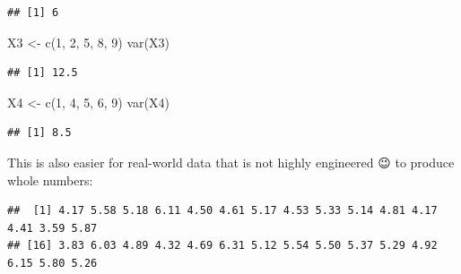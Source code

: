 \documentclass[
]{book}
\newenvironment{Shaded}{\begin{snugshade}}{\end{snugshade}}
\newcommand{\DecValTok}[1]{\textcolor[rgb]{0.00,0.00,0.81}{#1}}
\newcommand{\FunctionTok}[1]{\textcolor[rgb]{0.00,0.00,0.00}{#1}}
\newcommand{\NormalTok}[1]{#1}
\newcommand{\OtherTok}[1]{\textcolor[rgb]{0.56,0.35,0.01}{#1}}
\newcommand{\SpecialCharTok}[1]{\textcolor[rgb]{0.00,0.00,0.00}{#1}}
\begin{document}
\begin{verbatim}
## [1] 6
\end{verbatim}

\begin{Shaded}
\begin{Highlighting}[]
\NormalTok{X3 }\OtherTok{\textless{}{-}} \FunctionTok{c}\NormalTok{(}\DecValTok{1}\NormalTok{, }\DecValTok{2}\NormalTok{, }\DecValTok{5}\NormalTok{, }\DecValTok{8}\NormalTok{, }\DecValTok{9}\NormalTok{)}
\FunctionTok{var}\NormalTok{(X3)}
\end{Highlighting}
\end{Shaded}

\begin{verbatim}
## [1] 12.5
\end{verbatim}

\begin{Shaded}
\begin{Highlighting}[]
\NormalTok{X4 }\OtherTok{\textless{}{-}} \FunctionTok{c}\NormalTok{(}\DecValTok{1}\NormalTok{, }\DecValTok{4}\NormalTok{, }\DecValTok{5}\NormalTok{, }\DecValTok{6}\NormalTok{, }\DecValTok{9}\NormalTok{)}
\FunctionTok{var}\NormalTok{(X4)}
\end{Highlighting}
\end{Shaded}

\begin{verbatim}
## [1] 8.5
\end{verbatim}

This is also easier for real-world data that is not highly engineered 😉 to produce whole numbers:

\begin{Shaded}
\end{Shaded}

\begin{verbatim}
##  [1] 4.17 5.58 5.18 6.11 4.50 4.61 5.17 4.53 5.33 5.14 4.81 4.17 4.41 3.59 5.87
## [16] 3.83 6.03 4.89 4.32 4.69 6.31 5.12 5.54 5.50 5.37 5.29 4.92 6.15 5.80 5.26
\end{verbatim}

\begin{Shaded}
\end{Shaded}
\end{document}
